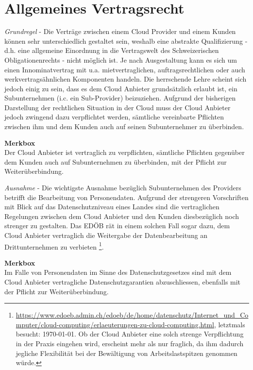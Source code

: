 \documentclass[a4paper,pointlessnumbers]{scrreprt}
\newcommand{\merkbox}[2][0.8\textwidth]{ \begin{center} \begin{tcolorbox}[enhanced, drop fuzzy midday shadow, width={#1}, opacityframe=0.5, colframe=BrickRed, colback=white] {\ECFTeenSpirit \color{BrickRed}\textbf{Merkbox} \qquad {\tiny das gilt es zu beachten}} \\  #2 \end{tcolorbox} \end{center}}
\begin{document}
\section{Allgemeines Vertragsrecht}
\textit{Grundregel} - Die Verträge zwischen einem Cloud Provider und einem Kunden können sehr unterschiedlich gestaltet sein, weshalb eine abstrakte Qualifizierung - d.h. eine allgemeine Einordnung in die Vertragswelt des Schweizerischen Obligationenrechts - nicht möglich ist.  Je nach Ausgestaltung kann es sich um einen Innominatvertrag mit u.a. mietvertraglichen, auftragsrechtlichen oder auch werkvertragsähnlichen Komponenten handeln. Die herrschende Lehre scheint sich jedoch einig zu sein, dass es dem Cloud Anbieter grundsätzlich erlaubt ist, ein Subunternehmen (i.c. ein Sub-Provider) beizuziehen. Aufgrund der bisherigen Darstellung der rechtlichen Situation in der Cloud muss der Cloud Anbieter jedoch zwingend dazu verpflichtet werden, sämtliche vereinbarte Pflichten zwischen ihm und dem Kunden auch auf seinen Subunternehmer zu überbinden.

\merkbox[0.7\textwidth]{Der Cloud Anbieter ist vertraglich zu verpflichten, sämtliche Pflichten gegenüber dem Kunden auch auf Subunternehmen zu überbinden, mit der Pflicht zur Weiterüberbindung.}

\textit{Ausnahme} - Die wichtigste Ausnahme bezüglich Subunternehmen des Providers betrifft die Bearbeitung von Personendaten. Aufgrund der strengeren Vorschriften mit Blick auf das Datenschutzniveau eines Landes sind die vertraglichen Regelungen zwischen dem Cloud Anbieter und den Kunden diesbezüglich noch strenger zu gestalten. Das EDÖB rät in einem solchen Fall sogar dazu, dem Cloud Anbieter vertraglich die Weitergabe der Datenbearbeitung an Drittunternehmen zu verbieten \footnote{\href{https://www.edoeb.admin.ch/edoeb/de/home/datenschutz/Internet\_und\_Computer/cloud-computing/erlaeuterungen-zu-cloud-computing.html}{https://www.edoeb.admin.ch/edoeb/de/home/datenschutz/Internet\_und\_Computer/cloud-computing/erlaeuterungen-zu-cloud-computing.html}, letztmals besucht: \today. Ob der Cloud Anbieter eine solch strenge Verpflichtung in der Praxis eingehen wird, erscheint mehr als nur fraglich, da ihm dadurch jegliche Flexibilität bei der Bewältigung von Arbeitslastspitzen genommen würde.}.

\merkbox[0.7\textwidth]{Im Falle von Personendaten im Sinne des Datenschutzgesetzes sind mit dem Cloud Anbieter vertragliche Datenschutzgarantien abzuschliessen, ebenfalls mit der Pflicht zur Weiterüberbindung.}
\end{document}
